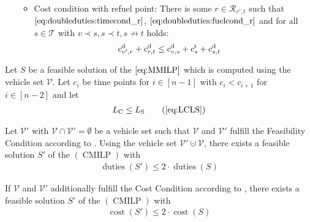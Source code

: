 \begin{definition}[Conditions]
\begin{enumerate}
\begin{itemize}
\begin{align}
			\end{align}
		\item Cost condition with refuel point: There is some ${r\in\mathcal{R}_{v',t}}$ such that $\eqref{eq:doubleduties:timecond_r}$, $\eqref{eq:doubleduties:fuelcond_r}$ and for all $s\in\mathcal{T}$ with ${v\prec s, s\prec t, s\not\to t}$ holds:
			\begin{align}
				c^{\operatorname{d}}_{v',r} + c^{\operatorname{d}}_{r,t} & \leq c^{\operatorname{d}}_{v,s} + c^{\operatorname{t}}_s + c^{\operatorname{d}}_{s,t} \label{eq:doubleduties:costcond_r}
			\end{align}
	\end{itemize}
\end{enumerate}

\end{definition}

\begin{theorem}
\label{thm:doubleduties}

Let $S$ be a feasible solution of the $\eqref{eq:MMILP}$ which is computed using the vehicle set $\mathcal{V}$. Let $c_i$ be time points for $i\in[n-1]$ with ${c_i<c_{i+1}}$ for ${i\in[n-2]}$ and let
\begin{align}
	L_{\operatorname{C}} \leq L_{\operatorname{S}} \tag{\ref{eq:LCLS}}
\end{align}

Let $\mathcal{V}'$ with ${\mathcal{V}\cap\mathcal{V}'=\emptyset}$ be a vehicle set such that $\mathcal{V}$ and $\mathcal{V}'$ fulfill the Feasibility Condition according to . Using the vehicle set $\mathcal{V}'\cupdot\mathcal{V}$, there exists a feasible solution $S'$ of the $(\operatorname{CMILP})$ with
\begin{align}
	\operatorname{duties}\left(S'\right) \leq 2\cdot\operatorname{duties}\left(S\right)
\end{align}

If $\mathcal{V}$ and $\mathcal{V}'$ additionally fulfill the Cost Condition according to , there exists a feasible solution $S'$ of the $(\operatorname{CMILP})$ with
\begin{align}
	\operatorname{cost}\left(S'\right) \leq 2\cdot\operatorname{cost}\left(S\right)
\end{align}

\end{theorem}

